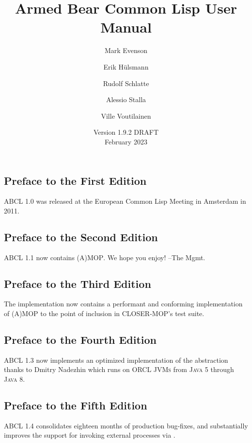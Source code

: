 \documentclass[10pt]{book}
\begin{document}
\title{Armed Bear Common Lisp User Manual}
\date{Version 1.9.2 DRAFT\\
\smallskip
February 2023}
\author{Mark Evenson \and Erik H\"{u}lsmann \and Rudolf Schlatte \and
  Alessio Stalla \and Ville Voutilainen}

\maketitle

\tableofcontents

\subsection{Preface to the First Edition}
\textsc{ABCL} 1.0 was released at the European Common Lisp Meeting
in Amsterdam in 2011.

\subsection{Preface to the Second Edition}
\textsc{ABCL} 1.1 now contains \textsc{(A)MOP}.  We hope you enjoy!
--The Mgmt.

\subsection{Preface to the Third Edition}
The implementation now contains a performant and conforming
implementation of \textsc{(A)MOP} to the point of inclusion in
\textsc{CLOSER-MOP}'s test suite.

\subsection{Preface to the Fourth Edition}

\textsc{ABCL} 1.3 now implements an optimized implementation of the
 abstraction thanks to Dmitry
Nadezhin which runs on ORCL \textsc{JVMs} from \textsc{Java 5} through
\textsc{Java 8}.

\subsection{Preface to the Fifth Edition}

\textsc{ABCL} 1.4 consolidates eighteen months of production bug-fixes,
and substantially improves the support for invoking external
processes via .
\end{document}
